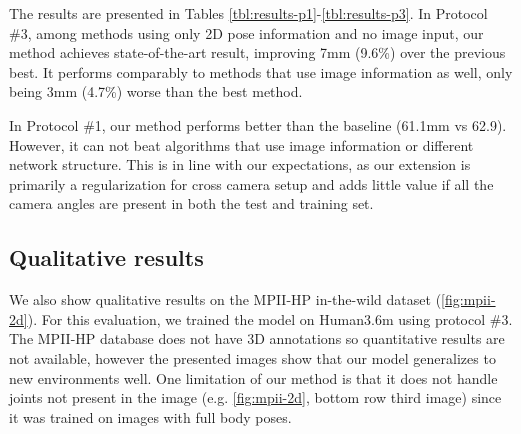 \documentclass[preprint]{elsarticle}
\begin{document}
The results are presented in Tables \ref{tbl:results-p1}-\ref{tbl:results-p3}. In Protocol \#3, among methods using only 2D pose information and no image input, our method achieves state-of-the-art result, improving 7mm (9.6\%) over the previous best. It performs comparably to methods that use image information as well, only being 3mm (4.7\%) worse than the best method.

In Protocol \#1, our method performs better than the baseline (61.1mm vs 62.9). However, it can not beat algorithms that use image information or different network structure. This is in line with our expectations, as our extension is primarily a regularization for cross camera setup and adds little value if all the camera angles are present in both the test and training set.


\subsection{Qualitative results}
We also show qualitative results on the MPII-HP in-the-wild dataset (\autoref{fig:mpii-2d}). For this evaluation, we trained the model on Human3.6m using protocol \#3. The MPII-HP database does not have 3D annotations so quantitative results are not available, however the presented images show that our model generalizes to new environments well. One limitation of our method is that it does not handle joints not present in the image (e.g. \autoref{fig:mpii-2d}, bottom row third image) since it was trained on images with full body poses.
\end{document}
